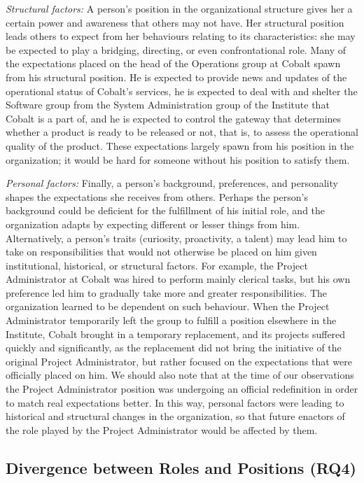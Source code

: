 \documentclass[10pt, conference, compsocconf]{IEEEtran}
\begin{document}
\emph{Structural factors:} A person's position in the organizational structure gives her a certain power and awareness that others may not have. Her structural position leads others to expect from her behaviours relating to its characteristics: she may be expected to play a bridging, directing, or even confrontational role. Many of the expectations placed on the head of the Operations group at Cobalt spawn from his structural position. He is expected to provide news and updates of the operational status of Cobalt's services, he is expected to deal with and shelter the Software group from the System Administration group of the Institute that Cobalt is a part of, and he is expected to control the gateway that determines whether a product is ready to be released or not, that is, to assess the operational quality of the product. These expectations largely spawn from his position in the organization; it would be hard for someone without his position to satisfy them.

\emph{Personal factors:} Finally, a person's background, preferences, and personality shapes the expectations she receives from others. Perhaps the person's background could be deficient for the fulfillment of his initial role, and the organization adapts by expecting different or lesser things from him. Alternatively, a person's traits (curiosity, proactivity, a talent) may lead him to take on responsibilities that would not otherwise be placed on him given institutional, historical, or structural factors. For example, the Project Administrator at Cobalt was hired to perform mainly clerical tasks, but his own preference led him to gradually take more and greater responsibilities. The organization learned to be dependent on such behaviour. When the Project Administrator temporarily left the group to fulfill a position elsewhere in the Institute, Cobalt brought in a temporary replacement, and its projects suffered quickly and significantly, as the replacement did not bring the initiative of the original Project Administrator, but rather focused on the expectations that were officially placed on him. We should also note that at the time of our observations the Project Administrator position was undergoing an official redefinition in order to match real expectations better. In this way, personal factors were leading to historical and structural changes in the organization, so that future enactors of the role played by the Project Administrator would be affected by them.

\subsection{Divergence between Roles and Positions (RQ4)}
\end{document}
